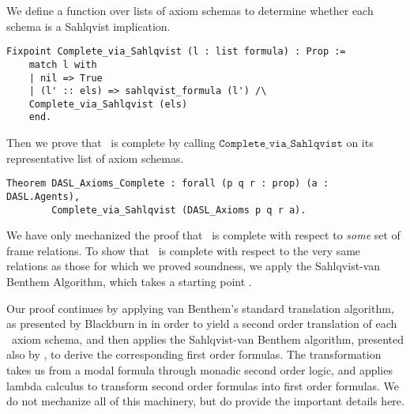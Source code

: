 We define a function over lists of axiom schemas to determine whether each schema is a Sahlqvist implication.

\begin{tcolorbox}
	\begin{lstlisting}[language=Coq]
	Fixpoint Complete_via_Sahlqvist (l : list formula) : Prop :=  
	match l with
	| nil => True
	| (l' :: els) => sahlqvist_formula (l') /\ 
	Complete_via_Sahlqvist (els)
	end.
	\end{lstlisting}
\end{tcolorbox}

Then we prove that \DASL\ is complete by calling $\mathtt{Complete\_via\_Sahlqvist}$ on its representative list of axiom schemas.

\begin{tcolorbox}
	\begin{lstlisting}[language=Coq]
Theorem DASL_Axioms_Complete : forall (p q r : prop) (a : DASL.Agents),
		Complete_via_Sahlqvist (DASL_Axioms p q r a).
	\end{lstlisting}
\end{tcolorbox}

We have only mechanized the proof that \DASL\ is complete with respect to \emph{some} set of frame relations. To show that \DASL\ is complete with respect to the very same relations as those for which we proved soundness, we apply the Sahlqvist-van Benthem Algorithm, which takes a starting point . 


Our proof continues by applying van Benthem's standard translation algorithm, as presented by Blackburn \etal in \cite{modal} in order to yield a second order translation of each \DASL\ axiom schema, and then applies the Sahlqvist-van Benthem algorithm, presented also by \cite{modal}, to derive the corresponding first order formulas. The transformation takes us from a modal formula through monadic second order logic, and applies lambda calculus to transform second order formulas into first order formulas. We do not mechanize all of this machinery, but do provide the important details here.

